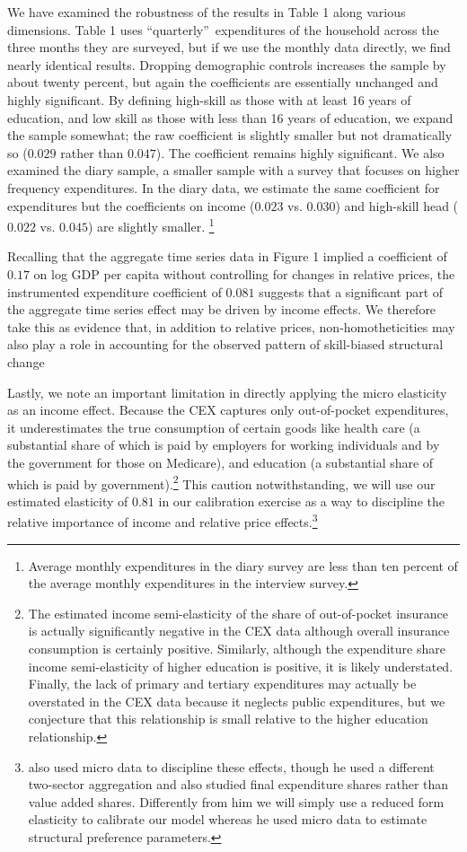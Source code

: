 \documentclass[12pt,english]{article}
\begin{document}
We have examined the robustness of the results in Table 1 along various
dimensions. Table 1 uses \textquotedblleft quarterly\textquotedblright\
expenditures of the household across the three months they are surveyed, but
if we use the monthly data directly, we find nearly identical results.
Dropping demographic controls increases the sample by about twenty percent,
but again the coefficients are essentially unchanged and highly significant.
By defining high-skill as those with at least 16 years of education, and low
skill as those with less than 16 years of education, we expand the sample
somewhat; the raw coefficient is slightly smaller but not dramatically so ($%
0.029$ rather than $0.047$). The coefficient remains highly significant. We
also examined the diary sample, a smaller sample with a survey that focuses
on higher frequency expenditures. In the diary data, we estimate the same
coefficient for expenditures but the coefficients on income ($0.023$ vs. $%
0.030$) and high-skill head ($0.022$ vs. $0.045$) are slightly smaller.%
\footnote{%
Average monthly expenditures in the diary survey are less than ten percent
of the average monthly expenditures in the interview survey.}

Recalling that the aggregate time series data in Figure 1 implied a
coefficient of $0.17$ on log GDP per capita without controlling for changes
in relative prices, the instrumented expenditure coefficient of $0.081$
suggests that a significant part of the aggregate time series effect may be
driven by income effects. We therefore take this as evidence that, in
addition to relative prices, non-homotheticities may also play a role in
accounting for the observed pattern of skill-biased structural change

Lastly, we note an important limitation in directly applying the micro
elasticity as an income effect. Because the CEX captures only out-of-pocket
expenditures, it underestimates the true consumption of certain goods like
health care (a substantial share of which is paid by employers for working
individuals and by the government for those on Medicare), and education (a
substantial share of which is paid by government).\footnote{%
The estimated income semi-elasticity of the share of out-of-pocket insurance
is actually significantly negative in the CEX data although overall
insurance consumption is certainly positive. Similarly, although the
expenditure share income semi-elasticity of higher education is positive, it
is likely understated. Finally, the lack of primary and tertiary
expenditures may actually be overstated in the CEX data because it neglects
public expenditures, but we conjecture that this relationship is small
relative to the higher education relationship.} This caution
notwithstanding, we will use our estimated elasticity of $0.81$ in our
calibration exercise as a way to discipline the relative importance of
income and relative price effects.\footnote{\citet{Bop14} also used micro
data to discipline these effects, though he used a different two-sector
aggregation and also studied final expenditure shares rather than value
added shares. Differently from him we will simply use a reduced form
elasticity to calibrate our model whereas he used micro data to estimate
structural preference parameters.}
\end{document}
